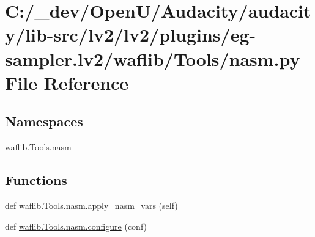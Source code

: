 \hypertarget{lv2_2plugins_2eg-sampler_8lv2_2waflib_2_tools_2nasm_8py}{}\section{C\+:/\+\_\+dev/\+Open\+U/\+Audacity/audacity/lib-\/src/lv2/lv2/plugins/eg-\/sampler.lv2/waflib/\+Tools/nasm.py File Reference}
\label{lv2_2plugins_2eg-sampler_8lv2_2waflib_2_tools_2nasm_8py}
\subsection*{Namespaces}
\begin{DoxyCompactItemize}
\item 
 \hyperlink{namespacewaflib_1_1_tools_1_1nasm}{waflib.\+Tools.\+nasm}
\end{DoxyCompactItemize}
\subsection*{Functions}
\begin{DoxyCompactItemize}
\item 
def \hyperlink{namespacewaflib_1_1_tools_1_1nasm_a43879d6ce11e92cbb0978a352bf863ce}{waflib.\+Tools.\+nasm.\+apply\+\_\+nasm\+\_\+vars} (self)
\item 
def \hyperlink{namespacewaflib_1_1_tools_1_1nasm_aeea053be55b9909c496dfe1a4d62ce68}{waflib.\+Tools.\+nasm.\+configure} (conf)
\end{DoxyCompactItemize}

